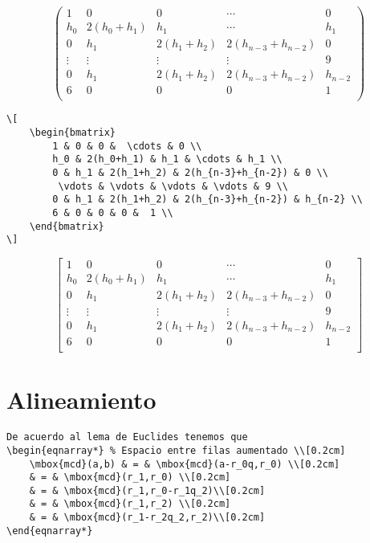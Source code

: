 \documentclass[a4,10pt]{aleph-notas}
\theoremstyle{definition}
\theoremstyle{plain}
\begin{document}
\[
    \begin{pmatrix}
        1 & 0 & 0 &  \cdots & 0 \\
        h_0 & 2(h_0+h_1) & h_1 & \cdots & h_1 \\
        0 & h_1 & 2(h_1+h_2) & 2(h_{n-3}+h_{n-2}) & 0 \\
         \vdots & \vdots & \vdots & \vdots & 9 \\
        0 & h_1 & 2(h_1+h_2) & 2(h_{n-3}+h_{n-2}) & h_{n-2} \\
        6 & 0 & 0 & 0 &  1 \\
    \end{pmatrix}
\]

\begin{lstlisting}[frame=single]
\[
    \begin{bmatrix}
        1 & 0 & 0 &  \cdots & 0 \\
        h_0 & 2(h_0+h_1) & h_1 & \cdots & h_1 \\
        0 & h_1 & 2(h_1+h_2) & 2(h_{n-3}+h_{n-2}) & 0 \\
         \vdots & \vdots & \vdots & \vdots & 9 \\
        0 & h_1 & 2(h_1+h_2) & 2(h_{n-3}+h_{n-2}) & h_{n-2} \\
        6 & 0 & 0 & 0 &  1 \\
    \end{bmatrix}
\]
\end{lstlisting}

\[
    \begin{bmatrix}
        1 & 0 & 0 &  \cdots & 0 \\
        h_0 & 2(h_0+h_1) & h_1 & \cdots & h_1 \\
        0 & h_1 & 2(h_1+h_2) & 2(h_{n-3}+h_{n-2}) & 0 \\
         \vdots & \vdots & \vdots & \vdots & 9 \\
        0 & h_1 & 2(h_1+h_2) & 2(h_{n-3}+h_{n-2}) & h_{n-2} \\
        6 & 0 & 0 & 0 &  1 \\
    \end{bmatrix}
\]

\section{Alineamiento}

\begin{lstlisting}[frame=single]
De acuerdo al lema de Euclides tenemos que
\begin{eqnarray*} % Espacio entre filas aumentado \\[0.2cm]
    \mbox{mcd}(a,b) & = & \mbox{mcd}(a-r_0q,r_0) \\[0.2cm]
    & = & \mbox{mcd}(r_1,r_0) \\[0.2cm]
    & = & \mbox{mcd}(r_1,r_0-r_1q_2)\\[0.2cm]
    & = & \mbox{mcd}(r_1,r_2) \\[0.2cm]
    & = & \mbox{mcd}(r_1-r_2q_2,r_2)\\[0.2cm]
\end{eqnarray*}
\end{lstlisting}
\end{document}
